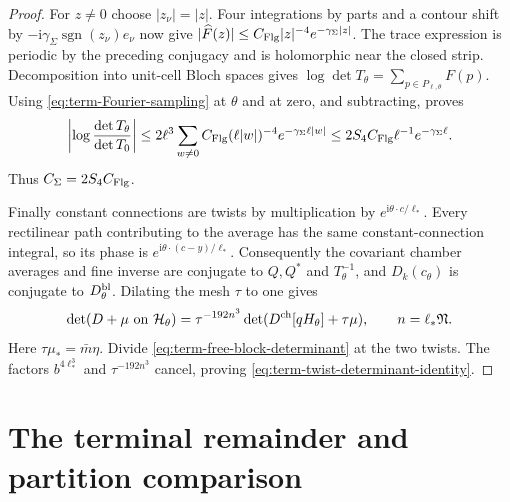 \begin{proof}
For $z\ne0$ choose $|z_\nu|=|z|$.
Four integrations by parts and a contour shift by
$-\mathrm i\gamma_\Sigma\operatorname{sgn}(z_\nu)e_\nu$
now give
$|\widehat F(z)|\le C_{\rm Flg}|z|^{-4}
e^{-\gamma_\Sigma|z|}$.
The trace expression is periodic by the preceding
conjugacy and is holomorphic near the closed strip.
Decomposition into unit-cell Bloch spaces gives
$\log\det T_\theta=\sum_{p\in P_{\ell,\theta}}F(p)$.
Using \eqref{eq:term-Fourier-sampling} at $\theta$ and
at zero, and subtracting, proves
\[
 \left|\log\frac{\det T_\theta}{\det T_0}\right|
 \le2\ell^3\sum_{w\ne0}C_{\rm Flg}(\ell|w|)^{-4}
                                    e^{-\gamma_\Sigma\ell|w|}
 \le2S_4C_{\rm Flg}\ell^{-1}e^{-\gamma_\Sigma\ell}.
\]
Thus $C_\Sigma=2S_4C_{\rm Flg}$.

Finally constant connections are twists by multiplication
by $e^{\mathrm i\theta\cdot c/\ell_*}$.
Every rectilinear path contributing to the average has
the same constant-connection integral, so its phase is
$e^{\mathrm i\theta\cdot(c-y)/\ell_*}$.
Consequently the covariant chamber averages and fine
inverse are conjugate to $Q,Q^*$ and $T_\theta^{-1}$,
and $D_k(c_\theta)$ is conjugate to $D_\theta^{\rm bl}$.
Dilating the mesh $\tau$ to one gives
\[
 \det(D+\mu\text{ on }\mathcal H_\theta)
          =\tau^{-192n^3}\det(D^{\rm ch}[qH_\theta]+\tau\mu),
                \qquad n=\ell_*\mathfrak N .
\]
Here $\tau\mu_*=\bar m\eta$.
Divide \eqref{eq:term-free-block-determinant} at the two
twists. The factors $b^{4\ell_*^3}$ and
$\tau^{-192n^3}$ cancel, proving
\eqref{eq:term-twist-determinant-identity}.
\end{proof}

\section{The terminal remainder and partition comparison}
\label{subsec:term-remainder}


